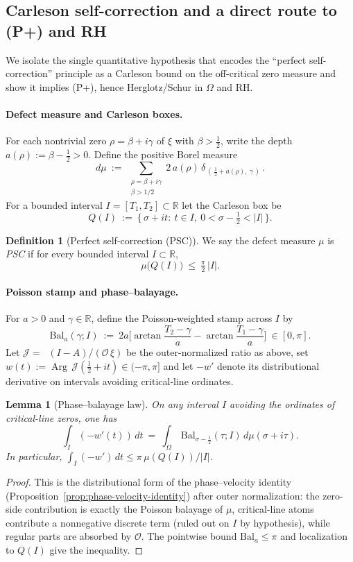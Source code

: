\documentclass[11pt]{article}
\newtheorem{lemma}[theorem]{Lemma}
\theoremstyle{definition}
\newtheorem{definition}[theorem]{Definition}
\theoremstyle{remark}
\newcommand{\R}{\mathbb{R}}
\DeclareMathOperator{\dettwo}{det_2}
\DeclareMathOperator{\Arg}{Arg}
\begin{document}
\subsection{Carleson self-correction and a direct route to (P+) and RH}\label{subsec:PSC}
We isolate the single quantitative hypothesis that encodes the ``perfect self-correction'' principle as a Carleson bound on the off-critical zero measure and show it implies (P+), hence Herglotz/Schur in \(\Omega\) and RH.

\paragraph{Defect measure and Carleson boxes.}
For each nontrivial zero \(\rho=\beta+i\gamma\) of \(\xi\) with \(\beta>\tfrac12\), write the depth \(a(\rho):=\beta-\tfrac12>0\). Define the positive Borel measure
\[
 d\mu\ :=\ \sum_{\substack{\rho=\beta+i\gamma\\ \beta>1/2}} 2\,a(\rho)\,\delta_{\,(\,\tfrac12+a(\rho),\ \gamma\,)}\,.
\]
For a bounded interval \(I=[T_1,T_2]\subset\R\) let the Carleson box be
\[
 Q(I)\ :=\ \{\,\sigma+it:\ t\in I,\ 0<\sigma-\tfrac12<|I|\,\}.
\]
\begin{definition}[Perfect self-correction (PSC)]\label{def:PSC}
We say the defect measure \(\mu\) is \emph{PSC} if for every bounded interval \(I\subset\R\),
\[
 \mu\big(Q(I)\big)\ \le\ \tfrac{\pi}{2}\,|I|.
\]
\end{definition}

\paragraph{Poisson stamp and phase--balayage.}
For \(a>0\) and \(\gamma\in\R\), define the Poisson-weighted stamp across \(I\) by
\[
 \mathrm{Bal}_a(\gamma;I)\ :=\ 2a\Big[\arctan\!\frac{T_2-\gamma}{a}-\arctan\!\frac{T_1-\gamma}{a}\Big]\ \in [0,\pi].
\]
Let \(\mathcal J=\dettwo(I-A)/(\mathcal O\,\xi)\) be the outer-normalized ratio as above, set \(w(t):=\Arg\,\mathcal J(\tfrac12+it)\in(-\pi,\pi] \) and let \(-w'\) denote its distributional derivative on intervals avoiding critical-line ordinates.

\begin{lemma}[Phase--balayage law]\label{lem:balayage-law}
On any interval \(I\) avoiding the ordinates of critical-line zeros, one has
\[
 \int_I (-w'(t))\,dt\ =\ \int_{\Omega}\, \mathrm{Bal}_{\sigma-\frac12}(\tau;I)\, d\mu(\sigma+i\tau).
\]
In particular, \(\int_I (-w')\,dt\le \pi\, \mu(Q(I))/|I|\).
\end{lemma}
\begin{proof}
This is the distributional form of the phase--velocity identity (Proposition~\ref{prop:phase-velocity-identity}) after outer normalization: the zero-side contribution is exactly the Poisson balayage of \(\mu\), critical-line atoms contribute a nonnegative discrete term (ruled out on \(I\) by hypothesis), while regular parts are absorbed by \(\mathcal O\). The pointwise bound \(\mathrm{Bal}_a\le\pi\) and localization to \(Q(I)\) give the inequality.
\end{proof}
\end{document}

